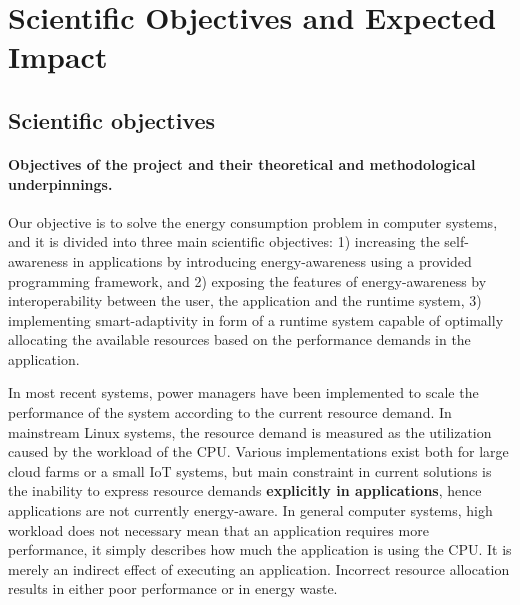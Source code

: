 \documentclass{article}
\begin{document}
\section{Scientific Objectives and Expected Impact}
\subsection{Scientific objectives}
\paragraph{Objectives of the project and their theoretical and methodological underpinnings.}
Our objective is to solve the energy consumption problem in computer systems, and it is divided into three main scientific objectives:
1) increasing the self-awareness in applications by introducing energy-awareness using a provided programming framework, 
and 2) exposing the features of energy-awareness by interoperability between the user, the application and the runtime system, 3) implementing smart-adaptivity in form of a runtime system capable of optimally allocating the available resources based on the performance demands in the application. \smallskip

In most recent systems, power managers have been implemented to scale the performance of the system according to the current resource demand.
In mainstream Linux systems, the resource demand is measured as the utilization caused by the workload of the CPU. 
Various implementations exist both for large cloud farms or a small IoT systems, 
but main constraint in current solutions is the inability to express resource demands \textbf{explicitly in applications}, hence applications are not currently energy-aware.
In general computer systems, high workload does not necessary mean that an application requires more performance, it simply describes how much the application is using the CPU.
It is merely an indirect effect of executing an application.
Incorrect resource allocation results in either poor performance or in energy waste.\smallskip

\end{document}
